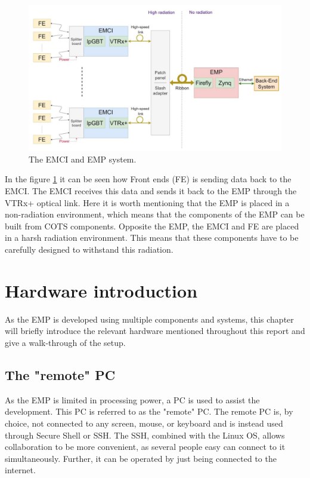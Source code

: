 \begin{figure}[H]
    \centering
    \includegraphics[width=1\textwidth]{Graphics/pic 1.png}
    \caption{The EMCI and EMP system.}
    \label{fig:pic1}
\end{figure}

\noindent In the figure \ref{fig:pic1} it can be seen how Front ends (FE) is sending data back to the EMCI. The EMCI receives this data and sends it back to the EMP through the VTRx+ optical link. Here it is worth mentioning that the EMP is placed in a non-radiation environment, which means that the components of the EMP can be built from COTS components. Opposite the EMP, the EMCI and FE are placed in a harsh radiation environment. This means that these components have to be carefully designed to withstand this radiation. \\

\section{Hardware introduction}

As the EMP is developed using multiple components and systems, this chapter will briefly introduce the relevant hardware mentioned throughout this report and give a walk-through of the setup.

\subsection{The "remote" PC}

As the EMP is limited in processing power, a PC is used to assist the development. This PC is referred to as the "remote" PC. The remote PC is, by choice, not connected to any screen, mouse, or keyboard and is instead used through Secure Shell or SSH. The SSH, combined with the Linux OS, allows collaboration to be more convenient, as several people easy can connect to it simultaneously. Further, it can be operated by just being connected to the internet. \\

